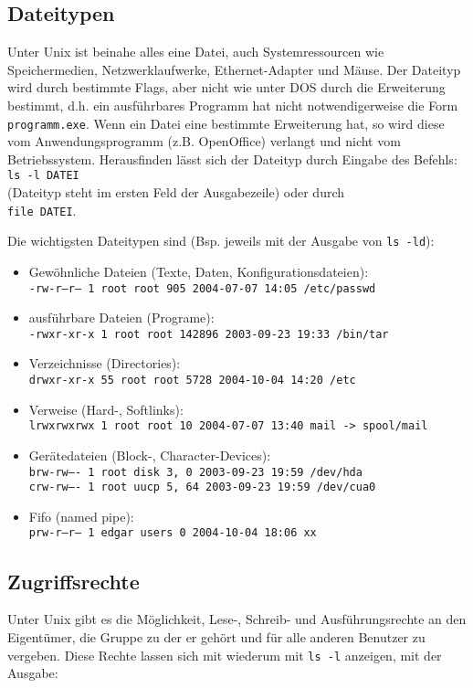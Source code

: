 \documentclass[11pt]{article}
\begin{document}
\subsection{Dateitypen}
Unter Unix ist beinahe alles eine Datei, auch Systemressourcen wie
Speichermedien, Netzwerklaufwerke, Ethernet-Adapter und Mäuse. Der
Dateityp wird durch bestimmte Flags, aber nicht wie unter DOS durch
die Erweiterung bestimmt, d.h. ein ausführbares Programm hat nicht
notwendigerweise die Form \texttt{programm.exe}. Wenn ein Datei eine
bestimmte Erweiterung hat, so wird diese vom Anwendungsprogramm (z.B.
OpenOffice) verlangt und nicht vom Betriebssystem. Herausfinden lässt
sich der Dateityp durch Eingabe des Befehls:\\
\texttt{ls -l DATEI} \\
(Dateityp steht im ersten Feld der Ausgabezeile) oder durch \\
\texttt{file DATEI}. 

Die wichtigsten Dateitypen sind (Bsp. jeweils mit der Ausgabe von
\texttt{ls -ld}):
\begin{itemize}
\item Gewöhnliche Dateien (Texte, Daten, Konfigurationsdateien):\\
\texttt{-rw-r--r--    1 root     root          905 2004-07-07 14:05
/etc/passwd}
\item ausführbare Dateien (Programe): \\
\texttt{-rwxr-xr-x    1 root     root       142896 2003-09-23 19:33
/bin/tar}
\item Verzeichnisse (Directories): \\
\texttt{drwxr-xr-x   55 root     root         5728 2004-10-04 14:20
/etc}
\item Verweise (Hard-, Softlinks): \\
\texttt{lrwxrwxrwx    1 root     root           10 2004-07-07 13:40 mail
-> spool/mail}
\item Gerätedateien (Block-, Character-Devices): \\
\texttt{brw-rw----    1 root     disk       3,   0 2003-09-23 19:59
/dev/hda} \\
\texttt{crw-rw----    1 root     uucp       5,  64 2003-09-23 19:59
/dev/cua0}
\item Fifo (named pipe): \\
\texttt{prw-r--r--    1 edgar    users           0 2004-10-04 18:06 xx}
\end{itemize}


\subsection{Zugriffsrechte}
Unter Unix gibt es die Möglichkeit, Lese-, Schreib- und
Ausführungsrechte an den Eigentümer, die Gruppe zu der er gehört und
für alle anderen Benutzer zu vergeben. Diese Rechte lassen sich mit
wiederum mit \texttt{ls -l} anzeigen, mit der Ausgabe: \\
\end{document}
